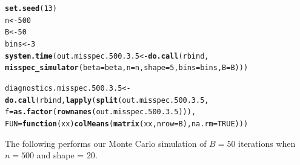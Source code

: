 \documentclass[11pt]{article}\usepackage[]{graphicx}\usepackage[]{color}
\makeatletter
\newcommand{\hlnum}[1]{\textcolor[rgb]{0.686,0.059,0.569}{#1}}%
\newcommand{\hlstd}[1]{\textcolor[rgb]{0.345,0.345,0.345}{#1}}%
\newcommand{\hlkwa}[1]{\textcolor[rgb]{0.161,0.373,0.58}{\textbf{#1}}}%
\newcommand{\hlkwb}[1]{\textcolor[rgb]{0.69,0.353,0.396}{#1}}%
\newcommand{\hlkwc}[1]{\textcolor[rgb]{0.333,0.667,0.333}{#1}}%
\newcommand{\hlkwd}[1]{\textcolor[rgb]{0.737,0.353,0.396}{\textbf{#1}}}%
\newenvironment{kframe}{%
 \def\at@end@of@kframe{}%
 \ifinner\ifhmode%
  \def\at@end@of@kframe{\end{minipage}}%
  \begin{minipage}{\columnwidth}%
 \fi\fi%
 \def\FrameCommand##1{\hskip\@totalleftmargin \hskip-\fboxsep
 \colorbox{shadecolor}{##1}\hskip-\fboxsep
     \hskip-\linewidth \hskip-\@totalleftmargin \hskip\columnwidth}%
 \MakeFramed {\advance\hsize-\width
   \@totalleftmargin\z@ \linewidth\hsize
   \@setminipage}}%
 {\par\unskip\endMakeFramed%
 \at@end@of@kframe}
\newenvironment{knitrout}{}{} %
\makeatother
\begin{document}
\begin{knitrout}
\color{fgcolor}\begin{kframe}
\begin{alltt}
\hlkwd{set.seed}\hlstd{(}\hlnum{13}\hlstd{)}
\hlstd{n} \hlkwb{<-} \hlnum{500}
\hlstd{B} \hlkwb{<-} \hlnum{50}
\hlstd{bins} \hlkwb{<-} \hlnum{3}
\hlkwd{system.time}\hlstd{(out.misspec.500.3.5} \hlkwb{<-} \hlkwd{do.call}\hlstd{(rbind,}
  \hlkwd{misspec_simulator}\hlstd{(}\hlkwc{beta} \hlstd{= beta,} \hlkwc{n} \hlstd{= n,} \hlkwc{shape} \hlstd{=} \hlnum{5}\hlstd{,} \hlkwc{bins} \hlstd{= bins,} \hlkwc{B} \hlstd{= B)))}
\end{alltt}


{\ttfamily\noindent\bfseries\color{errorcolor}{\#\# Error in chol.default(crossprod(x) + lambda[j] * diag(v)): the leading minor of order 5 is not positive definite}}

{\ttfamily\noindent\itshape\color{messagecolor}{\#\# Timing stopped at: 0.262 0 0.261}}\begin{alltt}
\hlstd{diagnostics.misspec.500.3.5} \hlkwb{<-} \hlkwd{do.call}\hlstd{(rbind,} \hlkwd{lapply}\hlstd{(}\hlkwd{split}\hlstd{(out.misspec.500.3.5,}
  \hlkwc{f} \hlstd{=} \hlkwd{as.factor}\hlstd{(}\hlkwd{rownames}\hlstd{(out.misspec.500.3.5))),}
  \hlkwc{FUN} \hlstd{=} \hlkwa{function}\hlstd{(}\hlkwc{xx}\hlstd{)} \hlkwd{colMeans}\hlstd{(}\hlkwd{matrix}\hlstd{(xx,} \hlkwc{nrow} \hlstd{= B),} \hlkwc{na.rm} \hlstd{=} \hlnum{TRUE}\hlstd{)))}
\end{alltt}


{\ttfamily\noindent\bfseries\color{errorcolor}{\#\# Error in split(out.misspec.500.3.5, f = as.factor(rownames(out.misspec.500.3.5))): object 'out.misspec.500.3.5' not found}}\end{kframe}
\end{knitrout}


The following performs our Monte Carlo simulation of $B = 50$ iterations 
when $n = 500$ and shape = $20$.
\end{document}
